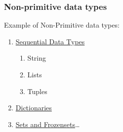 \documentclass{beamer}
\begin{document}
\begin{frame}[fragile]
\frametitle{Non-primitive data types}
Example of Non-Primitive data types:
\begin{enumerate}
	\item \href{http://www.python-course.eu/sequential_data_types.php}{Sequential Data Types}
	  \begin{enumerate}
	    \item String
	    \item Lists
	    \item Tuples
	  \end{enumerate}
	\item \href{http://www.python-course.eu/dictionaries.php}{Dictionaries}
	\item \href{http://www.python-course.eu/sets_frozensets.php}{Sets and Frozensets}\ldots

\end{enumerate}

\end{frame}

	





%


%
\end{document}
